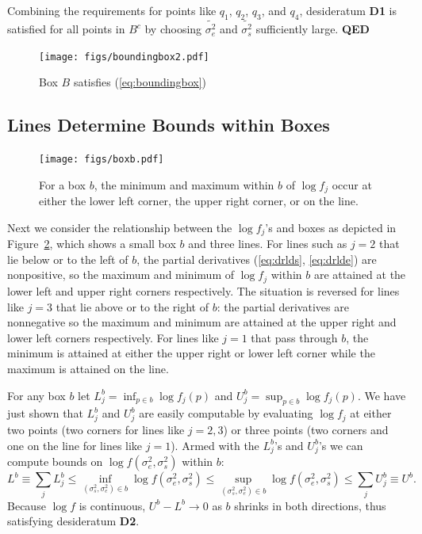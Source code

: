 \documentclass{report}
\newcommand{\RL}{f}
\newcommand{\logRL}{\log\RL}
\newcommand{\sigssq}{\sigma_s^2}
\newcommand{\sigesq}{\sigma_e^2}
\newcommand{\logRLss}{\logRL(\sigesq,\sigssq)}
\begin{document}
Combining the requirements for points like $q_1$, $q_2$, $q_3$, and $q_4$, desideratum \textbf{D1} is satisfied for all points in $B^c$ by choosing $\widetilde{\sigma_e^2}$ and $\widetilde{\sigma_s^2}$ sufficiently large.  \textbf{QED}\\

\begin{figure}[h]
	\centering
	\texttt{[image: figs/boundingbox2.pdf]}
	\caption{Box $B$ satisfies (\ref{eq:boundingbox})}
	\label{fig:boundingbox2}
\end{figure}


\subsection{Lines Determine Bounds within Boxes}
\label{sec:boundsinboxes}
\begin{figure}
	\centering
	\texttt{[image: figs/boxb.pdf]}
	\caption{For a box $b$,  the minimum and
	maximum within $b$ of $\logRL_j$
	occur at either the lower left corner, the upper right  corner, or
	on the line.
}	\label{fig:boxb}
\end{figure}
Next we consider the relationship between the $\logRL_j$'s and boxes as depicted in Figure~\ref{fig:boxb}, which shows a small box $b$ and three lines.  For lines such as $j=2$ that lie below or to the left of $b$, the partial derivatives (\ref{eq:drlds}, \ref{eq:drlde}) are nonpositive, so the maximum and minimum of $\logRL_j$ within $b$ are attained at the lower left and upper right corners respectively.  The situation is reversed for lines like $j=3$ that lie above or to the right of $b$: the partial derivatives are nonnegative so the maximum and minimum are attained at the upper right and lower left corners respectively.  For lines like $j=1$ that pass through $b$, the minimum is attained at either the upper right or lower left corner while the maximum is attained on the line.

For any box $b$ let $L^b_j = \inf_{p\in b} \logRL_j(p)$ and $U^b_j = \sup_{p\in b} \logRL_j(p)$.  We have just shown that $L^b_j$ and $U^b_j$ are easily computable by evaluating $\logRL_j$ at either two points (two corners for lines like $j=2,3$) or three points (two corners and one on the line for lines like $j=1$).
Armed with the $L^b_j$'s and $U^b_j$'s we can compute bounds on $\logRLss$ within $b$:
\begin{equation}
\label{eq:bounds}
	L^b \equiv \sum_j L^b_j \le \inf_{(\sigssq,\sigesq)\in b} \logRLss \le
	\sup_{(\sigssq,\sigesq)\in b} \logRLss \le \sum_j U^b_j \equiv U^b.
\end{equation}
Because $\logRL$ is continuous, $U^b - L^b \rightarrow 0$ as $b$ shrinks in both directions, thus satisfying desideratum \textbf{D2}.
\end{document}
